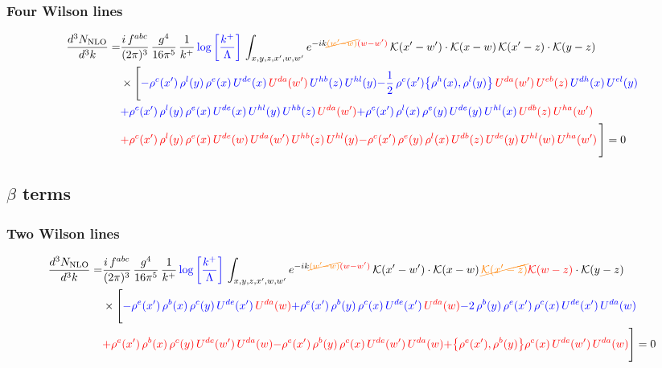 \documentclass[9pt]{article}
\numberwithin{equation}{section}
\begin{document}
\subsubsection{Four Wilson lines}
\begin{align}
    \frac{d^{3}N_{\rm NLO}}{d^{3}k}= & \frac{i\,f^{abc}}{(2\pi)^{3}}\,\frac{g^{4}}{16\pi^{5}}\,\frac{1}{k^{+}}\,{\color{blue}\log{\left[\frac{k^{+}}{\Lambda}\right]}}\,\int_{x,y,z,x',w,w'}e^{-ik{\color{orange}\cancel{(w'-w)}}{\color{red}(w-w')}}\,\mathcal{K}(x'-w')\cdot\mathcal{K}(x-w)\,\mathcal{K}(x'-z)\cdot\mathcal{K}(y-z)\notag \\ & \times\Bigg[{\color{blue}-\rho^{c}(x')\,\rho^{l}(y)\,\rho^{e}(x)\,U^{de}(x)\,{\color{red}U^{da}(w')}\,U^{hb}(z)\,U^{hl}(y)}{\color{blue}-\frac{1}{2}\,\rho^{c}(x')\big\{\rho^{h}(x),\rho^{l}(y)\big\}\,{\color{red}U^{da}(w')}\,{\color{red}U^{eb}(z)}\,U^{dh}(x)\,U^{el}(y)}\notag \\ & {\color{blue}+\rho^{c}(x')\,\rho^{l}(y)\,\rho^{e}(x)\,U^{de}(x)\,U^{hl}(y)\,U^{hb}(z)\,{\color{red}U^{da}(w')}}{\color{blue}+\rho^{c}(x')\,\rho^{l}(x)\,\rho^{e}(y)\,U^{de}(y)\,U^{hl}(x)\,{\color{red}U^{db}(z)}\,{\color{red}U^{ha}(w')}}\notag \\ &{\color{red}+\rho^{c}(x')\,\rho^{l}(y)\,\rho^{e}(x)\,U^{de}(w)\,{\color{red}U^{da}(w')}\,U^{hb}(z)\,U^{hl}(y)}{\color{red}-\rho^{c}(x')\,\rho^{e}(y)\,\rho^{l}(x)\,{\color{red}U^{db}(z)}\,U^{de}(y)\,U^{hl}(w)\,U^{ha}(w')}\,\Bigg] = 0
\end{align}
\subsection{$\beta$ terms}
\subsubsection{Two Wilson lines}
\begin{align}
    \frac{d^{3}N_{\rm NLO}}{d^{3}k}= & \frac{i\,f^{abc}}{(2\pi)^{3}}\,\frac{g^{4}}{16\pi^{5}}\,\frac{1}{k^{+}}\,{\color{blue}\log{\left[\frac{k^{+}}{\Lambda}\right]}}\,\int_{x,y,z,x',w,w'}e^{-ik{\color{orange}\cancel{(w'-w)}}{\color{red}(w-w')}}\,\mathcal{K}(x'-w')\cdot\mathcal{K}(x-w)\,{\color{orange}\cancel{\mathcal{K}(x'-z)}}{\color{red}\mathcal{K}(w-z)}\cdot\mathcal{K}(y-z)\notag \\ & \times\Bigg[{\color{blue}-\rho^{e}(x')\,\rho^{b}(x)\,\rho^{c}(y)\,U^{de}(x')\,{\color{red}U^{da}(w)}}{\color{blue}+\rho^{e}(x')\,\rho^{b}(y)\,\rho^{c}(x)\,U^{de}(x')\,{\color{red}U^{da}(w)}}{\color{blue}-2\,\rho^{b}(y)\,\rho^{e}(x')\, \rho^{c}(x)\, U^{de}(x')\,U^{da}(w)}\notag \\ & {\color{red}+\rho^{e}(x')\,\rho^{b}(x)\,\rho^{c}(y)\,U^{de}(w')\,{\color{red}U^{da}(w)}}{\color{red}-\rho^{e}(x')\,\rho^{b}(y)\,\rho^{c}(x)\,U^{de}(w')\,{\color{red}U^{da}(w)}}{\color{red}+\big\{\rho^{e}(x'),\rho^{b}(y)\big\}\rho^{c}(x)\,U^{de}(w')\,{\color{red}U^{da}(w)}}\Bigg] = 0
\end{align}   
\end{document}
